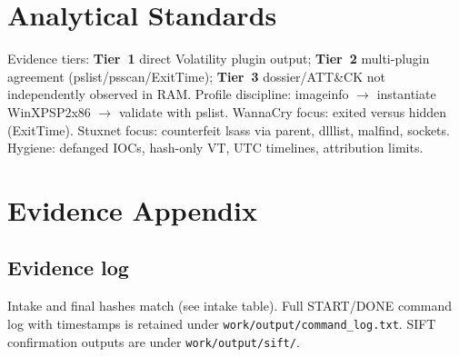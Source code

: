 \documentclass[11pt,letterpaper]{article}
\begin{document}
\section*{Analytical Standards}
Evidence tiers: \textbf{Tier~1} direct Volatility plugin output; \textbf{Tier~2} multi-plugin agreement
(pslist/psscan/ExitTime); \textbf{Tier~3} dossier/ATT\&CK not independently observed in RAM.
Profile discipline: imageinfo $\rightarrow$ instantiate WinXPSP2x86 $\rightarrow$ validate with pslist.
WannaCry focus: exited versus hidden (ExitTime). Stuxnet focus: counterfeit lsass via parent, dlllist, malfind, sockets.
Hygiene: defanged IOCs, hash-only VT, UTC timelines, attribution limits.


\section*{Evidence Appendix}
\subsection*{Evidence log}
Intake and final hashes match (see intake table). Full START/DONE command log with timestamps is retained under
\texttt{work/output/command\_log.txt}. SIFT confirmation outputs are under \texttt{work/output/sift/}.
\end{document}
